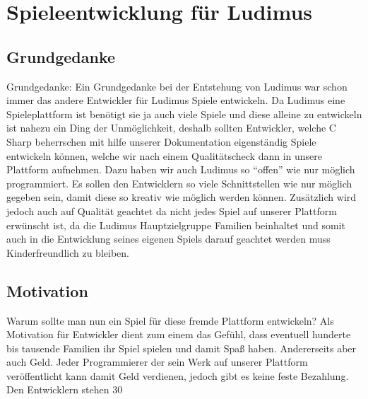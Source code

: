 \section{Spieleentwicklung für Ludimus}
\subsection{Grundgedanke}
Grundgedanke:
Ein Grundgedanke bei der Entstehung von Ludimus war schon immer das andere Entwickler für Ludimus Spiele entwickeln. Da Ludimus eine Spieleplattform ist benötigt sie ja auch viele Spiele und diese alleine zu entwickeln ist nahezu ein Ding der Unmöglichkeit, deshalb sollten Entwickler, welche C Sharp beherrschen mit hilfe unserer Dokumentation eigenständig Spiele entwickeln können, welche wir nach einem Qualitätscheck dann in unsere Plattform aufnehmen.
Dazu haben wir auch Ludimus so “offen” wie nur möglich programmiert. Es sollen den Entwicklern so viele Schnittstellen wie nur möglich gegeben sein, damit diese so kreativ wie möglich werden können. Zusätzlich wird jedoch auch auf Qualität geachtet da nicht jedes Spiel auf unserer Plattform erwünscht ist, da die Ludimus Hauptzielgruppe Familien beinhaltet und somit auch in die Entwicklung seines eigenen Spiels darauf geachtet werden muss Kinderfreundlich zu bleiben. 
\subsection{Motivation}
Warum sollte man nun ein Spiel für diese fremde Plattform entwickeln? Als Motivation für Entwickler dient zum einem das Gefühl, dass eventuell hunderte bis tausende Familien ihr Spiel spielen und damit Spaß haben. Andererseits aber auch Geld. Jeder Programmierer der sein Werk auf unserer Plattform veröffentlicht kann damit Geld verdienen, jedoch gibt es keine feste Bezahlung. Den Entwicklern stehen 30%
